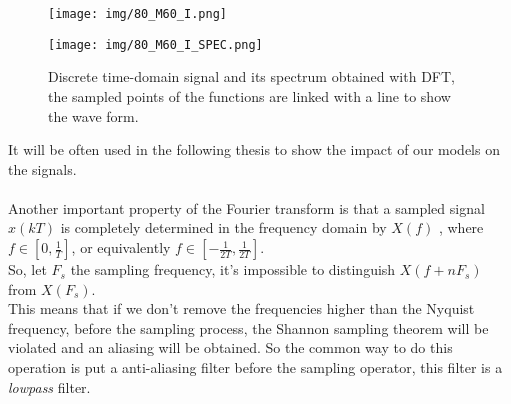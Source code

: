 \begin{figure}[h]
\begin{minipage}{.5\textwidth}
\texttt{[image: img/80\_M60\_I.png]} 
\end{minipage}
\begin{minipage}{.5\textwidth}
\texttt{[image: img/80\_M60\_I\_SPEC.png]} 
\end{minipage}
\caption{Discrete time-domain signal and its spectrum obtained with DFT, the sampled points of the functions are linked with a line to show the wave form.}\label{fig:transform80}
\end{figure}
It will be often used in the following thesis to show the impact of our models on the signals.\\\\
Another important property of the Fourier transform is that a sampled signal $x(kT)$ is completely determined in the frequency domain by $X(f)$ , where $f \in [0, \frac{1}{T}]$, or equivalently $f \in [-\frac{1}{2T}, \frac{1}{2T}]$.\\
So, let $F_s$ the sampling frequency, it's impossible to distinguish $X(f + nF_s)$ from $X(F_s)$.\\ 
This means that if we don't remove the frequencies higher than the Nyquist frequency, before the sampling process, the Shannon sampling theorem will be violated and an aliasing will be obtained. So the common way to do this operation is put a anti-aliasing filter before the sampling operator, this filter is a \textit{lowpass} filter.
